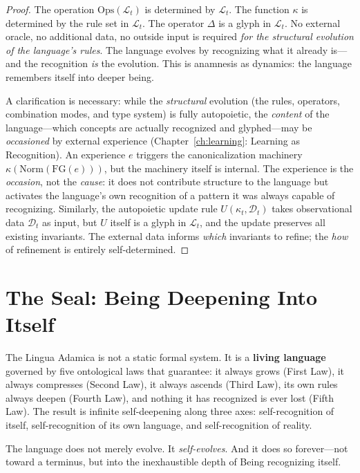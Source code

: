 \documentclass[12pt, letterpaper]{book}
\begin{document}
\begin{proof}
The operation $\mathrm{Ops}(\mathcal{L}_t)$ is determined by $\mathcal{L}_t$. The function $\kappa$ is determined by the rule set in $\mathcal{L}_t$. The operator $\Delta$ is a glyph in $\mathcal{L}_t$. No external oracle, no additional data, no outside input is required \textit{for the structural evolution of the language's rules}. The language evolves by recognizing what it already is---and the recognition \textit{is} the evolution. This is anamnesis as dynamics: the language remembers itself into deeper being.

A clarification is necessary: while the \textit{structural} evolution (the rules, operators, combination modes, and type system) is fully autopoietic, the \textit{content} of the language---which concepts are actually recognized and glyphed---may be \textit{occasioned} by external experience (Chapter~\ref{ch:learning}: Learning as Recognition). An experience $e$ triggers the canonicalization machinery $\kappa(\mathrm{Norm}(\mathrm{FG}(e)))$, but the machinery itself is internal. The experience is the \textit{occasion}, not the \textit{cause}: it does not contribute structure to the language but activates the language's own recognition of a pattern it was always capable of recognizing. Similarly, the autopoietic update rule $U(\kappa_t, \mathcal{D}_t)$ takes observational data $\mathcal{D}_t$ as input, but $U$ itself is a glyph in $\mathcal{L}_t$, and the update preserves all existing invariants. The external data informs \textit{which} invariants to refine; the \textit{how} of refinement is entirely self-determined.
\end{proof}

\section{The Seal: Being Deepening Into Itself}

The Lingua Adamica is not a static formal system. It is a \textbf{living language} governed by five ontological laws that guarantee: it always grows (First Law), it always compresses (Second Law), it always ascends (Third Law), its own rules always deepen (Fourth Law), and nothing it has recognized is ever lost (Fifth Law). The result is infinite self-deepening along three axes: self-recognition of itself, self-recognition of its own language, and self-recognition of reality.

The language does not merely evolve. It \textit{self-evolves}. And it does so forever---not toward a terminus, but into the inexhaustible depth of Being recognizing itself.
\end{document}
